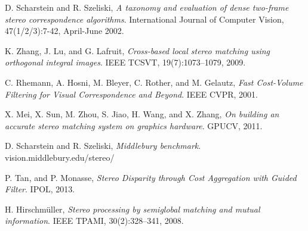 \documentclass{article}
\begin{document}
\begin{thebibliography}{9}

	D. Scharstein and R. Szeliski,
   	\emph{ A taxonomy and evaluation of dense two-frame stereo correspondence algorithms}.
	International Journal of Computer Vision, 
	47(1/2/3):7-42, 
	April-June 2002.

	K. Zhang, J. Lu, and G. Lafruit,
	\emph{ Cross-based local stereo matching using orthogonal integral images}.
	IEEE TCSVT,
	19(7):1073–1079,
	2009.
	
	C. Rhemann, A. Hosni, M. Bleyer, C. Rother, and M. Gelautz,
	\emph{Fast Cost-Volume Filtering for Visual Correspondence and Beyond}.
	IEEE CVPR,
	2001.
	
	X. Mei, X. Sun, M. Zhou, S. Jiao, H. Wang, and X. Zhang,
	\emph{On building an accurate stereo matching system on graphics hardware}.
	GPUCV,
	2011.

	D. Scharstein and R. Szeliski,
	\emph{ Middlebury benchmark}.
	vision.middlebury.edu/stereo/
	
	P. Tan, and P. Monasse,
	\emph{Stereo Disparity through Cost Aggregation with Guided Filter}.
	IPOL,
	2013.	
	
	H. Hirschmüller,
	\emph{Stereo processing by semiglobal matching
and mutual information}.
	IEEE TPAMI,
	30(2):328–341,
	2008.


\end{thebibliography}
\end{document}
